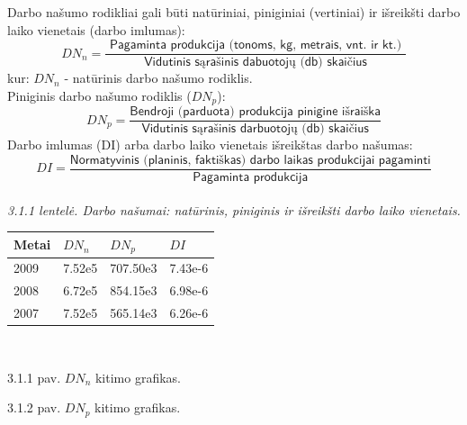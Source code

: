 \documentclass[11pt,a4paper]{article}
\begin{document}
Darbo našumo rodikliai gali būti natūriniai, piniginiai (vertiniai) ir išreikšti darbo laiko vienetais (darbo imlumas):
\[
DN_n = \frac{ 
		\textsf{ Pagaminta produkcija (tonoms, kg, metrais, vnt. ir kt.) }
	}{
		\textsf{ Vidutinis sąrašinis dabuotojų (db) skaičius }
	}
\]
kur: $DN_n$ - natūrinis darbo našumo rodiklis.\\
Piniginis darbo našumo rodiklis ($DN_p$):
\[
DN_p = \frac {
		\textsf{Bendroji (parduota) produkcija pinigine išraiška}
	}{
		\textsf{Vidutinis sąrašinis darbuotojų (db) skaičius}
	}
\]
Darbo imlumas (DI) arba darbo laiko vienetais išreikštas darbo našumas:
\[
DI = \frac {
		\textsf{Normatyvinis (planinis, faktiškas) darbo laikas produkcijai pagaminti}
	}{
		\textsf{Pagaminta produkcija}
	}
\]\\
\textsl{3.1.1 lentelė. Darbo našumai: natūrinis, piniginis ir išreikšti darbo laiko vienetais.}\\
\begin{tabular}{|p{4cm}|p{4cm}|p{4cm}|p{4cm}|} \hline
	Metai & $DN_n$ & $DN_p$ & $DI$ \\ \hline
	2009 	& 7.52e5 & 707.50e3	& 7.43e-6	\\ \hline
	2008  & 6.72e5 & 854.15e3 & 6.98e-6 \\ \hline
	2007  & 7.52e5 & 565.14e3 & 6.26e-6 \\ \hline
\end{tabular}\\

\begin{center}
\end{center}
\textsf{3.1.1 pav. $DN_n$ kitimo grafikas.}\\

\begin{center}
\end{center}
\textsf{3.1.2 pav. $DN_p$ kitimo grafikas.}\\
\end{document}
